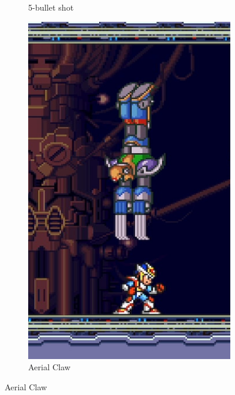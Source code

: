 \begin{figure}[htp]
\begin{minipage}{0.3\linewidth}
\begin{subfigure}{\linewidth}
			\caption{5-bullet shot}
		\end{subfigure}
	\end{minipage}
	\begin{minipage}{0.3\linewidth}		
		\begin{subfigure}{\linewidth}
			\centering
			\includegraphics[width=\linewidth]{figures/X2/Hunter_stages/Sigma_dive.png}
			\caption{Aerial Claw}
		\end{subfigure}
	\end{minipage}	
\end{figure}
